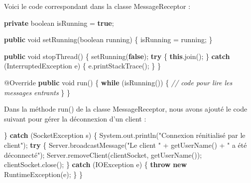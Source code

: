 \documentclass[
]{article}
\newenvironment{Shaded}{}{}
\newcommand{\AttributeTok}[1]{\textcolor[rgb]{0.49,0.56,0.16}{#1}}
\newcommand{\BuiltInTok}[1]{#1}
\newcommand{\CommentTok}[1]{\textcolor[rgb]{0.38,0.63,0.69}{\textit{#1}}}
\newcommand{\DataTypeTok}[1]{\textcolor[rgb]{0.56,0.13,0.00}{#1}}
\newcommand{\FunctionTok}[1]{\textcolor[rgb]{0.02,0.16,0.49}{#1}}
\newcommand{\KeywordTok}[1]{\textcolor[rgb]{0.00,0.44,0.13}{\textbf{#1}}}
\newcommand{\NormalTok}[1]{#1}
\newcommand{\StringTok}[1]{\textcolor[rgb]{0.25,0.44,0.63}{#1}}
\begin{document}
Voici le code correspondant dans la classe MessageReceptor :

\begin{Shaded}
\begin{Highlighting}[]
\KeywordTok{private} \DataTypeTok{boolean}\NormalTok{ isRunning = }\KeywordTok{true}\NormalTok{;}

\KeywordTok{public} \DataTypeTok{void} \FunctionTok{setRunning}\NormalTok{(}\DataTypeTok{boolean}\NormalTok{ running) \{}
\NormalTok{    isRunning = running;}
\NormalTok{\}}

\KeywordTok{public} \DataTypeTok{void} \FunctionTok{stopThread}\NormalTok{() \{}
    \FunctionTok{setRunning}\NormalTok{(}\KeywordTok{false}\NormalTok{);}
    \KeywordTok{try}\NormalTok{ \{}
        \KeywordTok{this}\NormalTok{.}\FunctionTok{join}\NormalTok{();}
\NormalTok{    \} }\KeywordTok{catch}\NormalTok{ (}\BuiltInTok{InterruptedException}\NormalTok{ e) \{}
\NormalTok{        e.}\FunctionTok{printStackTrace}\NormalTok{();}
\NormalTok{    \}}
\NormalTok{\}}

\AttributeTok{@Override}
\KeywordTok{public} \DataTypeTok{void} \FunctionTok{run}\NormalTok{() \{}
    \KeywordTok{while}\NormalTok{ (}\FunctionTok{isRunning}\NormalTok{()) \{}
        \CommentTok{// code pour lire les messages entrants}
\NormalTok{    \}}
\NormalTok{\}}
\end{Highlighting}
\end{Shaded}

Dans la méthode run() de la classe MessageReceptor, nous avons ajouté le
code suivant pour gérer la déconnexion d'un client :

\begin{Shaded}
\begin{Highlighting}[]
\NormalTok{\} }\KeywordTok{catch}\NormalTok{ (}\BuiltInTok{SocketException}\NormalTok{ s) \{}
    \BuiltInTok{System}\NormalTok{.}\FunctionTok{out}\NormalTok{.}\FunctionTok{println}\NormalTok{(}\StringTok{"Connexion rénitialisé par le client"}\NormalTok{);}
    \KeywordTok{try}\NormalTok{ \{}
\NormalTok{        Server.}\FunctionTok{broadcastMessage}\NormalTok{(}\StringTok{"Le client "}\NormalTok{ + }\FunctionTok{getUserName}\NormalTok{() + }\StringTok{" a été déconnecté"}\NormalTok{);}
\NormalTok{        Server.}\FunctionTok{removeClient}\NormalTok{(clientSocket, }\FunctionTok{getUserName}\NormalTok{());}
\NormalTok{        clientSocket.}\FunctionTok{close}\NormalTok{();}
\NormalTok{    \} }\KeywordTok{catch}\NormalTok{ (}\BuiltInTok{IOException}\NormalTok{ e) \{}
        \KeywordTok{throw} \KeywordTok{new} \BuiltInTok{RuntimeException}\NormalTok{(e);}
\NormalTok{    \}}
\NormalTok{\}}
\end{Highlighting}
\end{Shaded}
\end{document}
